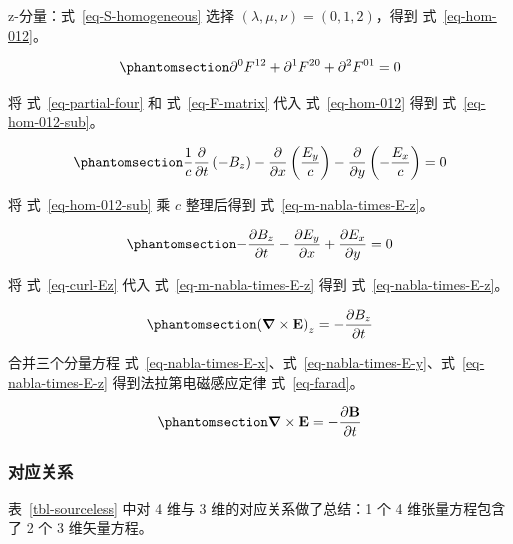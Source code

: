 \documentclass[
  chinese,
  a4paper,
  UTF8,
  12pt,
  oneside,
  openany]{ctexbook}
\theoremstyle{plain}
\theoremstyle{plain}
\theoremstyle{plain}
\theoremstyle{definition}
\theoremstyle{plain}
\theoremstyle{plain}
\theoremstyle{remark}
\begin{document}
z-分量：式~\ref{eq-S-homogeneous} 选择
\((\lambda,\mu,\nu) = (0,1,2)\)，得到 式~\ref{eq-hom-012}。

\begin{equation}\protect\phantomsection\label{eq-hom-012}{
\partial^{0}F^{12} + \partial^{1}F^{20} + \partial^{2}F^{01} = 0
}\end{equation}

将 式~\ref{eq-partial-four} 和 式~\ref{eq-F-matrix} 代入
式~\ref{eq-hom-012} 得到 式~\ref{eq-hom-012-sub}。

\begin{equation}\protect\phantomsection\label{eq-hom-012-sub}{
\frac{1}{c}\frac{\partial}{\partial t}\left(- B_z \right) - \frac{\partial}{\partial x}\left(\frac{E_y}{c} \right) - \frac{\partial}{\partial y}\left(- \frac{E_x}{c} \right) = 0
}\end{equation}

将 式~\ref{eq-hom-012-sub} 乘 \(c\) 整理后得到
式~\ref{eq-m-nabla-times-E-z}。

\begin{equation}\protect\phantomsection\label{eq-m-nabla-times-E-z}{
- \frac{\partial B_z}{\partial t} - \frac{\partial E_y}{\partial x} + \frac{\partial E_x}{\partial y} = 0
}\end{equation}

将 式~\ref{eq-curl-Ez} 代入 式~\ref{eq-m-nabla-times-E-z} 得到
式~\ref{eq-nabla-times-E-z}。

\begin{equation}\protect\phantomsection\label{eq-nabla-times-E-z}{
\left(\boldsymbol{\nabla} \times \mathbf{E} \right)_{z} = -\frac{\partial B_z}{\partial t}
}\end{equation}

合并三个分量方程
式~\ref{eq-nabla-times-E-x}、式~\ref{eq-nabla-times-E-y}、式~\ref{eq-nabla-times-E-z}
得到法拉第电磁感应定律 式~\ref{eq-farad}。

\begin{equation}\protect\phantomsection\label{eq-farad}{\boldsymbol{\nabla} \times \mathbf{E} = -\frac{\partial\mathbf{B}}{\partial t}}\end{equation}

\subsubsection{对应关系}\label{ux5bf9ux5e94ux5173ux7cfb-1}

表~\ref{tbl-sourceless} 中对 4 维与 3 维的对应关系做了总结：1 个 4
维张量方程包含了 2 个 3 维矢量方程。
\end{document}
